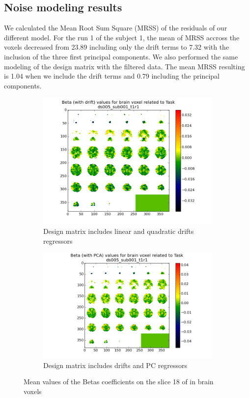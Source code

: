 \subsection{Noise modeling results}
\noindent
\par We calculated the Mean Root Sum Square (MRSS) of the residuals of our different model.
For the run 1 of the subject 1, the mean of MRSS accross the voxels decreased from 23.89 
including only the drift terms to 7.32 with the inclusion of the three first principal 
components. We also performed the same modeling of the design matrix with the filtered data.
The mean MRSS resulting is 1.04 when we include the drift terms and 0.79 including the 
principal components.

\begin{figure}[H]
\begin{subfigure}{.5\textwidth}
    \centering
    \includegraphics[width=.9\linewidth]{../fig/mosaic/ds005_sub001_t1r1_withdrift_Task.png}
    \caption{Design matrix includes linear and quadratic drifts regressors}
    \label{fig:betas1}
\end{subfigure}%
\begin{subfigure}{.5\textwidth}
    \centering
    \includegraphics[width=.8\linewidth]{../fig/mosaic/ds005_sub001_t1r1_withPCA_Task.png}
    \caption{Design matrix includes drifts and PC regressors}
    \label{fig:betas2}
\end{subfigure}
\caption{Mean values of the Betas coefficients on the slice 18 of in brain voxels}
\label{fig:betas}
\end{figure}

